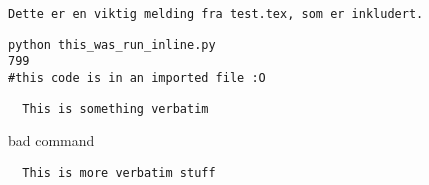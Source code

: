 

\begin{shadedquoteBlueBar}
\fontsize{9pt}{9pt}
\begin{Verbatim}
Dette er en viktig melding fra test.tex, som er inkludert.
\end{Verbatim}
\end{shadedquoteBlueBar}
\noindent

\realbad

\begin{Verbatim}[numbers=none,frame=lines,label=\fbox{{\tiny Terminal}},fontsize=\fontsize{9pt}{9pt},
labelposition=topline,framesep=2.5mm,framerule=0.7pt]
python this_was_run_inline.py
799
#this code is in an imported file :O
\end{Verbatim}
\noindent

\begin{Verbatim}
  This is something verbatim
\end{Verbatim}

\@begin bad command

\begin{Verbatim}
  This is more verbatim stuff
\end{Verbatim}



